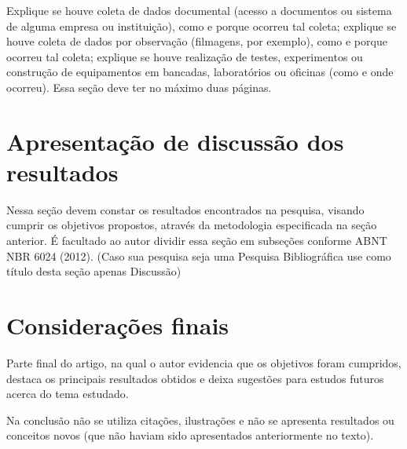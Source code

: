 \documentclass[
article,			%
11pt,				%
twoside,			%
a4paper,			%
section=TITLE,		%
onecolumn,          %
english,			%
brazil,				%
sumario=tradicional
]{abntex2}
\begin{document}
Explique se houve coleta de dados documental (acesso a documentos ou sistema de alguma empresa ou instituição), como e porque ocorreu tal coleta; explique se houve coleta de dados por observação (filmagens, por exemplo), como e porque ocorreu tal coleta; explique se houve realização de testes, experimentos ou construção de equipamentos em bancadas, laboratórios ou oficinas (como e onde ocorreu). Essa seção deve ter no máximo duas páginas.

\section{Apresentação de discussão dos resultados}
Nessa seção devem constar os resultados encontrados na pesquisa, visando cumprir os objetivos propostos, através da metodologia especificada na seção anterior. É facultado ao autor dividir essa seção em subseções conforme ABNT NBR 6024 (2012). 
(Caso sua pesquisa seja uma Pesquisa Bibliográfica use como título desta seção apenas Discussão)



    
 \section{Considerações finais}
 Parte final do artigo, na qual o autor evidencia que os objetivos foram cumpridos, destaca os principais resultados obtidos e deixa sugestões para estudos futuros acerca do tema estudado.
 
Na conclusão não se utiliza citações, ilustrações e não se apresenta resultados ou conceitos novos (que não haviam sido apresentados anteriormente no texto).

    
        
    \postextual                 %
    
    
    
\end{document}
